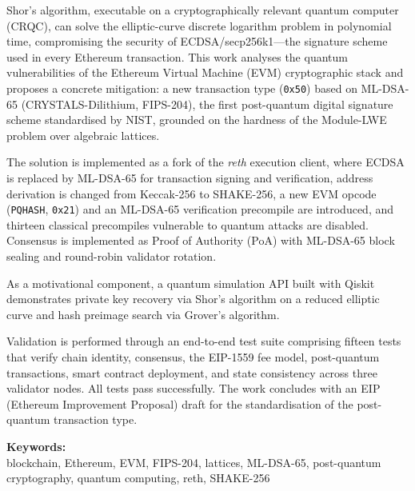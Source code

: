 Shor's algorithm, executable on a cryptographically relevant quantum computer (CRQC), can solve the elliptic-curve discrete logarithm problem in polynomial time, compromising the security of ECDSA/secp256k1---the signature scheme used in every Ethereum transaction. This work analyses the quantum vulnerabilities of the Ethereum Virtual Machine (EVM) cryptographic stack and proposes a concrete mitigation: a new transaction type (\texttt{0x50}) based on ML-DSA-65 (CRYSTALS-Dilithium, FIPS-204), the first post-quantum digital signature scheme standardised by NIST, grounded on the hardness of the Module-LWE problem over algebraic lattices.

The solution is implemented as a fork of the \emph{reth} execution client, where ECDSA is replaced by ML-DSA-65 for transaction signing and verification, address derivation is changed from Keccak-256 to SHAKE-256, a new EVM opcode (\texttt{PQHASH}, \texttt{0x21}) and an ML-DSA-65 verification precompile are introduced, and thirteen classical precompiles vulnerable to quantum attacks are disabled. Consensus is implemented as Proof of Authority (PoA) with ML-DSA-65 block sealing and round-robin validator rotation.

As a motivational component, a quantum simulation API built with Qiskit demonstrates private key recovery via Shor's algorithm on a reduced elliptic curve and hash preimage search via Grover's algorithm.

Validation is performed through an end-to-end test suite comprising fifteen tests that verify chain identity, consensus, the EIP-1559 fee model, post-quantum transactions, smart contract deployment, and state consistency across three validator nodes. All tests pass successfully. The work concludes with an EIP (Ethereum Improvement Proposal) draft for the standardisation of the post-quantum transaction type.

\vspace*{4\baselineskip}
\textbf{Keywords:}\\
blockchain, Ethereum, EVM, FIPS-204, lattices, ML-DSA-65, post-quantum cryptography, quantum computing, reth, SHAKE-256
